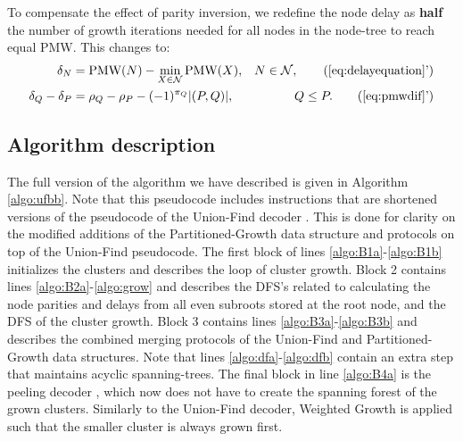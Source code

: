 To compensate the effect of parity inversion, we redefine the node delay as \textbf{half} the number of growth iterations needed for all nodes in the node-tree to reach equal PMW. This changes  to:
\begin{align}
    \delta_N &= \text{PMW}(N) - \min_{X\in\nset}{\text{PMW}(X)}, & N \in \nset, \tag{\ref{eq:delayequation}'}  \\
    \delta_Q - \delta_P &= \rho_Q-\rho_P - (-1)^{\pi_Q}\abs{(P,Q)}, & Q\leq P. \tag{\ref{eq:pmwdif}'}\label{eq:pmwdifnew}
\end{align}

\subsection{Algorithm description}\label{sec:pseudocode}

The full version of the algorithm we have described is given in Algorithm \ref{algo:ufbb}. Note that this pseudocode includes instructions that are shortened versions of the pseudocode of the Union-Find decoder \cite{delfosse2017almost}. This is done for clarity on the modified additions of the Partitioned-Growth data structure and protocols on top of the Union-Find pseudocode. The first block of lines \ref{algo:B1a}-\ref{algo:B1b} initializes the clusters and describes the loop of cluster growth. Block 2 contains lines \ref{algo:B2a}-\ref{algo:grow} and describes the DFS's related to calculating the node parities and delays from all even subroots stored at the root node, and the DFS of the cluster growth. Block 3 contains lines \ref{algo:B3a}-\ref{algo:B3b} and describes the combined merging protocols of the Union-Find and Partitioned-Growth data structures. Note that lines \ref{algo:dfa}-\ref{algo:dfb} contain an extra step that maintains acyclic spanning-trees. The final block in line \ref{algo:B4a} is the peeling decoder \cite{delfosse2017linear}, which now does not have to create the spanning forest of the grown clusters. Similarly to the Union-Find decoder, Weighted Growth is applied such that the smaller cluster is always grown first. 

